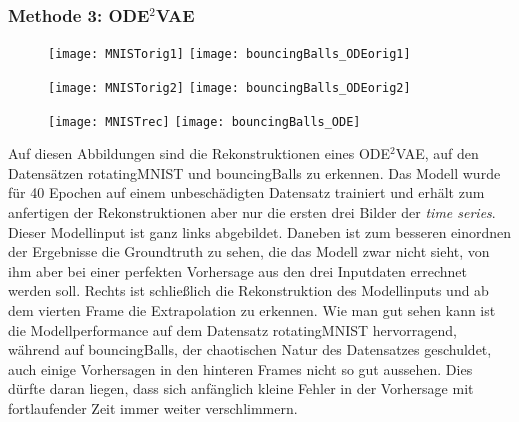\documentclass[12pt]{article}
\begin{document}
	\subsubsection{Methode 3: ODE$^2$VAE}
	\begin{figure}[h!]
		\begin{minipage}{0.18\textwidth}
			\begin{mdframed}[style=innersmall]
				\texttt{[image: MNISTorig1]}
				\center{}
				\texttt{[image: bouncingBalls\_ODEorig1]}
			\end{mdframed}
		\end{minipage}
		\begin{minipage}{0.34\textwidth}
			\begin{mdframed}[style=innersmall]
				\texttt{[image: MNISTorig2]}
				\center{}
				\texttt{[image: bouncingBalls\_ODEorig2]}
			\end{mdframed}
		\end{minipage}
		\begin{minipage}{0.48\textwidth}
			\begin{mdframed}[style=innersmall]
				\texttt{[image: MNISTrec]}
				\center{}
				\texttt{[image: bouncingBalls\_ODE]}
			\end{mdframed}
		\end{minipage}
	\end{figure}
	Auf diesen Abbildungen sind die Rekonstruktionen eines ODE$^2$VAE, auf den Datensätzen rotatingMNIST und bouncingBalls zu erkennen. Das Modell wurde für 40 Epochen auf einem unbeschädigten Datensatz trainiert und erhält zum anfertigen der Rekonstruktionen aber nur die ersten drei Bilder der \emph{time series}. 
	Dieser Modellinput ist ganz links abgebildet. Daneben ist zum besseren einordnen der Ergebnisse die Groundtruth zu sehen, die das Modell zwar nicht sieht, von ihm aber bei einer perfekten Vorhersage aus den drei Inputdaten errechnet werden soll. Rechts ist schließlich die Rekonstruktion des Modellinputs und ab dem vierten Frame die Extrapolation zu erkennen. Wie man gut sehen kann ist die Modellperformance auf dem Datensatz rotatingMNIST hervorragend, während auf  bouncingBalls, der chaotischen Natur des Datensatzes geschuldet, auch einige Vorhersagen in den hinteren Frames nicht so gut aussehen. Dies dürfte daran liegen, dass sich anfänglich kleine Fehler in der Vorhersage mit fortlaufender Zeit immer weiter verschlimmern. \\
\end{document}

